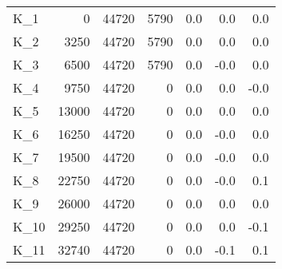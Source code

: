 \begin{tabular}{lrrrrrr}
K\_1 & 0 & 44720 & 5790 & 0.0 & 0.0 & 0.0 \\
K\_2 & 3250 & 44720 & 5790 & 0.0 & 0.0 & 0.0 \\
K\_3 & 6500 & 44720 & 5790 & 0.0 & -0.0 & 0.0 \\
K\_4 & 9750 & 44720 & 0 & 0.0 & 0.0 & -0.0 \\
K\_5 & 13000 & 44720 & 0 & 0.0 & 0.0 & 0.0 \\
K\_6 & 16250 & 44720 & 0 & 0.0 & -0.0 & 0.0 \\
K\_7 & 19500 & 44720 & 0 & 0.0 & -0.0 & 0.0 \\
K\_8 & 22750 & 44720 & 0 & 0.0 & -0.0 & 0.1 \\
K\_9 & 26000 & 44720 & 0 & 0.0 & 0.0 & 0.0 \\
K\_10 & 29250 & 44720 & 0 & 0.0 & 0.0 & -0.1 \\
K\_11 & 32740 & 44720 & 0 & 0.0 & -0.1 & 0.1 \\
\bottomrule
\end{tabular}
